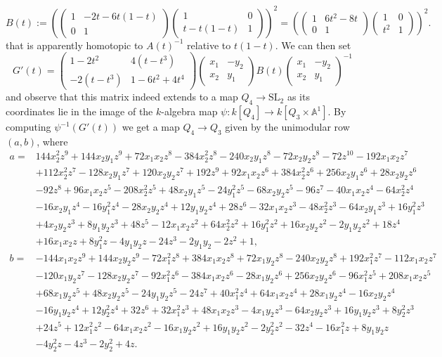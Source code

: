 \documentclass[11pt,leqno]{article}
\newcommand{\A}{{\mathbb A}}
\renewcommand{\1}{{\rm 1\hspace*{-0.4ex}%
\rule{0.1ex}{1.52ex}\hspace*{0.2ex}}}
\newcommand{\<}[1]{{\langle}#1 {\rangle}}
\theoremstyle{plain}
\theoremstyle{definition}
\theoremstyle{remark}
\numberwithin{equation}{section}
\begin{document}
\[
B(t) := \left(\begin{pmatrix}
    1 & -2t - 6t(1-t) \\ 0 & 1 
\end{pmatrix}\begin{pmatrix}
    1 & 0 \\ t - t(1-t) & 1
\end{pmatrix}\right)^2 = \left(\begin{pmatrix}
    1 & 6t^2-8t \\ 0 & 1 
\end{pmatrix}\begin{pmatrix}
    1 & 0 \\ t^2 & 1
\end{pmatrix}\right)^2. 
\]
that is apparently homotopic to $A(t)^{-1}$ relative to $t(1-t)$. We can then set 
\[
G'(t) = \begin{pmatrix} 1-2t^2 & 4(t-t^3) \\ -2(t-t^3) & 1-6t^2+4t^4 \end{pmatrix}\begin{pmatrix} x_1 & -y_2 \\ x_2 & y_1\end{pmatrix}B(t)\begin{pmatrix} x_1 & -y_2 \\ x_2 & y_1\end{pmatrix}^{-1}
\] 
and observe that this matrix indeed extends to a map $Q_4\to  \mathrm{SL}_2$ as its coordinates lie in the image of the $k$-algebra map $\psi \colon k[Q_4] \to k[Q_{3}\times \A^1]$. By computing $\psi^{-1}(G'(t))$ we get a map $Q_4 \to Q_3$ given by the unimodular row $(a,b)$, where
\begin{align*}
   a =& 144x_2^2z^9+144x_2y_1z^9+72x_1x_2z^8-384x_2^2z^8-240x_2y_1z^8-72x_2 y_2z^8-72z^{10}-192x_1x_2z^7\\ &+112x_2^2z^7-128x_2y_1z^7+120x_2y_2z^7+192 z^9+92x_1x_2z^6+384x_2^2z^6+256x_2y_1z^6+28x_2y_2z^6\\&-92z^8+96x_1x_2z ^5-208x_2^2z^5+48x_2y_1z^5-24y_1^2z^5-68x_2y_2z^5-96z^7-40x_1x_2z^4- 64x_2^2z^4\\&-16x_2y_1z^4-16y_1^2z^4-28x_2y_2z^4+12y_1y_2z^4+28z^6-32 x_1x_2z^3-48x_2^2z^3-64x_2y_1z^3+16y_1^2z^3\\&+4x_2y_2z^3+8y_1y_2z^3+48 z^5-12x_1x_2z^2+64x_2^2z^2+16y_1^2z^2+16x_2y_2z^2-2y_1y_2z^2+18z^4\\&+ 16x_1x_2z+8y_1^2z-4y_1y_2z-24z^3-2y_1y_2-2z^2+1, \\
   b = & -144x_1x_2z^9+144x_2y_2z^9-72x_1^2z^8+384x_1x_2z^8+72x_1y_2z^8-240x_2 y_2z^8+192x_1^2z^7- 112x_1x_2z^7\\&-120x_1y_2z^7-128x_2y_2z^7-92x_1^2z^6 -384x_1x_2z^6-28x_1y_2z^6+256x_2y_2z^6-96x_1^2z^5+208x_1x_2z^5\\&+68x_1 y_2z^5+48x_2y_2z^5-24y_1y_2z^5-24z^7+40x_1^2z^4+64x_1x_2z^4+28x_1y_2 z^4-16x_2y_2z^4\\&-16y_1y_2z^4+12y_2^2z^4+32z^6+32x_1^2z^3+48x_1x_2z^3- 4x_1y_2z^3-64x_2y_2z^3+16y_1y_2z^3+8y_2^2z^3\\&+24z^5+12x_1^2z^2-64x_1 x_2z^2-16x_1y_2z^2+16y_1y_2z^2-2y_2^2z^2-32z^4-16x_1^2z+8y_1y_2z\\&-4 y_2^2z-4z^3-2y_2^2+4z.
\end{align*}
\end{document}
